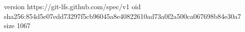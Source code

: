 version https://git-lfs.github.com/spec/v1
oid sha256:854d5e07edd73297f5cb96045a8e40822610ad73a0f2a500ca067698b84e30a7
size 1067
